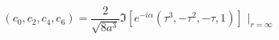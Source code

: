 \begin{equation}
 (c_0,c_2,c_4,c_6) = \frac{2}{\sqrt{8a^3}}
 \Im [e^{-i\alpha}(\tau^3,-\tau^2,-\tau,1)] \,\,\biggr|_{r=\infty}
\end{equation}


